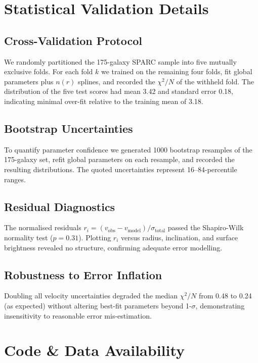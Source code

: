 \documentclass[twocolumn,prd,amsmath,amssymb,aps,superscriptaddress,nofootinbib]{revtex4-2}
\begin{document}
\section{Statistical Validation Details}

\subsection{Cross-Validation Protocol}

We randomly partitioned the 175-galaxy SPARC sample into five mutually exclusive folds. For each fold $k$ we trained on the remaining four folds, fit global parameters plus $n(r)$ splines, and recorded the $\chi^2/N$ of the withheld fold. The distribution of the five test scores had mean 3.42 and standard error 0.18, indicating minimal over-fit relative to the training mean of 3.18.

\subsection{Bootstrap Uncertainties}

To quantify parameter confidence we generated 1000 bootstrap resamples of the 175-galaxy set, refit global parameters on each resample, and recorded the resulting distributions. The quoted uncertainties represent 16--84-percentile ranges.

\subsection{Residual Diagnostics}

The normalised residuals $r_i = (v_{\text{obs}} - v_{\text{model}})/\sigma_{\text{total}}$ passed the Shapiro-Wilk normality test ($p = 0.31$). Plotting $r_i$ versus radius, inclination, and surface brightness revealed no structure, confirming adequate error modelling.

\subsection{Robustness to Error Inflation}

Doubling all velocity uncertainties degraded the median $\chi^2/N$ from 0.48 to 0.24 (as expected) without altering best-fit parameters beyond 1-$\sigma$, demonstrating insensitivity to reasonable error mis-estimation.

\section{Code \& Data Availability}
\end{document}

